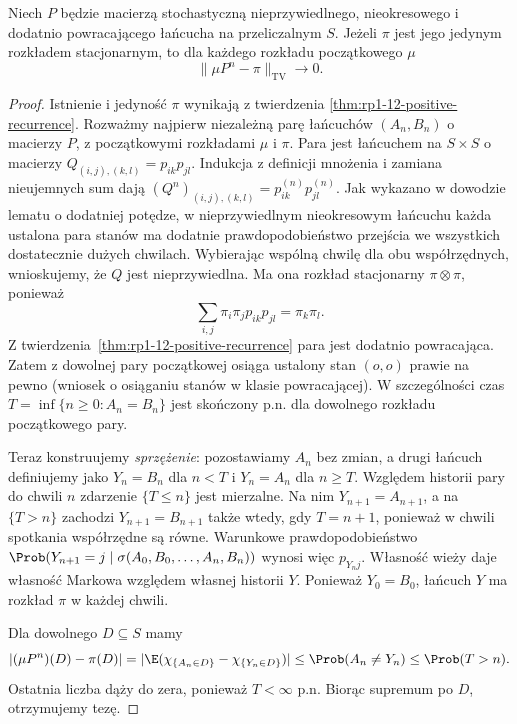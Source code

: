 \begin{twierdzenie}
\label{thm:rp1-12-countable-convergence}
Niech $P$ będzie macierzą stochastyczną
nieprzywiedlnego, nieokresowego i dodatnio
powracającego łańcucha na przeliczalnym $S$.
Jeżeli $\pi$ jest jego jedynym rozkładem stacjonarnym,
to dla każdego rozkładu początkowego $\mu$
\[
\|\mu P^n-\pi\|_{\mathrm{TV}}\longrightarrow0.
\]
\end{twierdzenie}
\begin{proof}
Istnienie i jedyność $\pi$ wynikają z twierdzenia
\ref{thm:rp1-12-positive-recurrence}.
Rozważmy najpierw niezależną parę łańcuchów
$(A_n,B_n)$ o macierzy $P$, z początkowymi
rozkładami $\mu$ i $\pi$. Para jest łańcuchem
na $S\times S$ o macierzy
$Q_{(i,j),(k,l)}=p_{ik}p_{jl}$. Indukcja z definicji
mnożenia i zamiana nieujemnych sum dają
$(Q^n)_{(i,j),(k,l)}=p_{ik}^{(n)}p_{jl}^{(n)}$.
Jak wykazano w dowodzie lematu o dodatniej potędze,
w nieprzywiedlnym nieokresowym łańcuchu każda
ustalona para stanów ma dodatnie prawdopodobieństwo
przejścia we wszystkich dostatecznie dużych chwilach.
Wybierając wspólną chwilę dla obu współrzędnych,
wnioskujemy, że $Q$ jest nieprzywiedlna.
Ma ona rozkład stacjonarny $\pi\otimes\pi$, ponieważ
\[
\sum_{i,j}\pi_i\pi_j p_{ik}p_{jl}=\pi_k\pi_l.
\]
Z twierdzenia~\ref{thm:rp1-12-positive-recurrence}
para jest dodatnio powracająca. Zatem z dowolnej
pary początkowej osiąga ustalony stan $(o,o)$
prawie na pewno (wniosek o osiąganiu stanów
w klasie powracającej). W szczególności czas
$T=\inf\{n\geq0:A_n=B_n\}$ jest skończony p.n.
dla dowolnego rozkładu początkowego pary.

Teraz konstruujemy \emph{sprzężenie}: pozostawiamy
$A_n$ bez zmian, a drugi łańcuch definiujemy jako
$Y_n=B_n$ dla $n<T$ i $Y_n=A_n$ dla $n\geq T$.
Względem historii pary do chwili $n$ zdarzenie
$\{T\leq n\}$ jest mierzalne. Na nim
$Y_{n+1}=A_{n+1}$, a na $\{T>n\}$ zachodzi
$Y_{n+1}=B_{n+1}$ także wtedy, gdy $T=n+1$,
ponieważ w chwili spotkania współrzędne są równe.
Warunkowe prawdopodobieństwo $\Prob(Y_{n+1}=j
\mid\sigma(A_0,B_0,\ldots,A_n,B_n))$ wynosi więc
$p_{Y_nj}$. Własność wieży daje własność Markowa
względem własnej historii $Y$. Ponieważ $Y_0=B_0$,
łańcuch $Y$ ma rozkład $\pi$ w każdej chwili.

Dla dowolnego $D\subseteq S$ mamy
\[
|(\mu P^n)(D)-\pi(D)|
=|\E(\chi_{\{A_n\in D\}}-\chi_{\{Y_n\in D\}})|
\leq\Prob(A_n\ne Y_n)\leq\Prob(T>n).
\]
Ostatnia liczba dąży do zera, ponieważ $T<\infty$ p.n.
Biorąc supremum po $D$, otrzymujemy tezę.
\end{proof}

